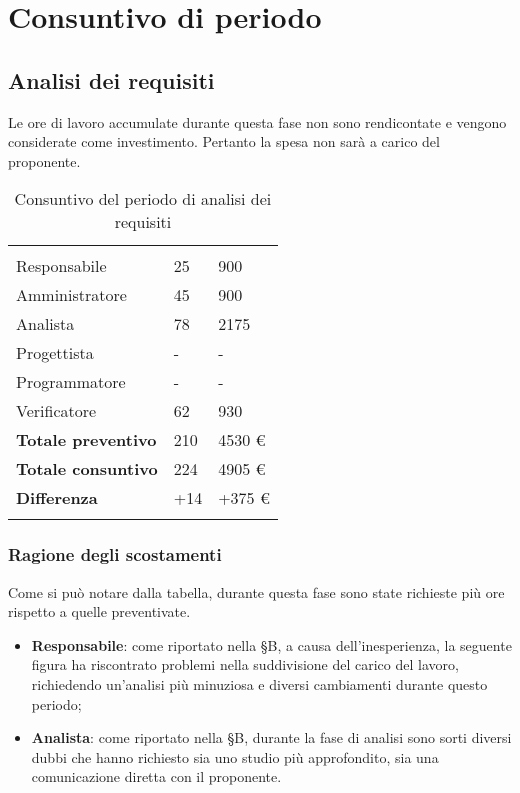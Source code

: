 \section{Consuntivo di periodo}


\subsection{Analisi dei requisiti}

Le ore di lavoro accumulate durante questa fase non sono rendicontate e vengono considerate come investimento. Pertanto la spesa non sarà a carico del proponente.

{
\setlength\arrayrulewidth{1pt}
\begin{longtable}{ C{4cm} C{3cm} C{3.5cm}} 
 	 &
 	 &
 	 \\
 	
 	Responsabile & 25  & 900 \\
 	Amministratore & 45 & 900\\
 	Analista & 78  & 2175 \\
 	Progettista & - & -\\
 	Programmatore & - & -\\
 	Verificatore & 62 & 930\\
 	
	\hline 	
 	
 	\textbf{Totale preventivo} &
	210 &
 	4530 € \\		
 	
 	\textbf{Totale consuntivo} &
	224 &
 	4905 € \\	
 	
 	\textbf{Differenza} &
	+14 &
 	+375 € \\	
 	
 	\caption{Consuntivo del periodo di analisi dei requisiti}
\end{longtable}
}

\subsubsection{Ragione degli scostamenti}
Come si può notare dalla tabella, durante questa fase sono state richieste più ore rispetto a quelle preventivate.
\begin{itemize}
\item \textbf{Responsabile}: come riportato nella \S B, a causa dell'inesperienza, la seguente figura ha riscontrato problemi nella suddivisione del carico del lavoro, richiedendo un'analisi più minuziosa e diversi cambiamenti durante questo periodo;
\item \textbf{Analista}: come riportato nella \S B, durante la fase di analisi sono sorti diversi dubbi che hanno richiesto sia uno studio più approfondito, sia una comunicazione diretta con il proponente.
\end{itemize}


